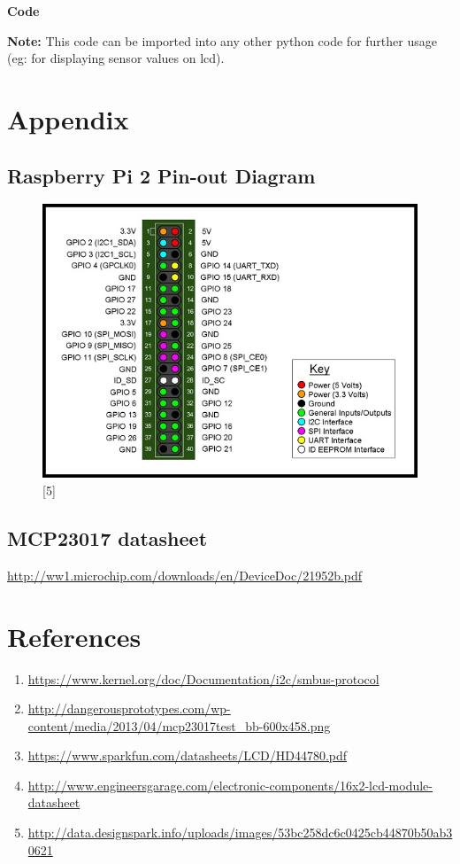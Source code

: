 \documentclass[11pt,a4paper]{article}
\begin{document}
	\newpage 
	\textbf{Code}
	\vspace{0.3cm}
	
	
	
	\vspace{0.3cm}
	\textbf{Note:} This code can be imported into any other python code for further usage (eg: for displaying sensor values on lcd).
	
	\newpage
	\section{Appendix}
	
	\subsection{Raspberry Pi 2 Pin-out Diagram}
	\begin{figure}[h!]
		\includegraphics[scale=0.6]{RaspberryPi2_pinout.jpg}
		\centering
		\caption{[5]}
	\end{figure}
			
	\subsection{MCP23017 datasheet}
			
	\url{http://ww1.microchip.com/downloads/en/DeviceDoc/21952b.pdf}
			
	\newpage
	\section{References}
	\begin{enumerate}
		\item \url{https://www.kernel.org/doc/Documentation/i2c/smbus-protocol}
		\item \url{http://dangerousprototypes.com/wp-content/media/2013/04/mcp23017test_bb-600x458.png}
		\item \url{https://www.sparkfun.com/datasheets/LCD/HD44780.pdf}
		\item \url{http://www.engineersgarage.com/electronic-components/16x2-lcd-module-datasheet}
		\item \url{http://data.designspark.info/uploads/images/53bc258dc6c0425cb44870b50ab30621}
    \end{enumerate}
	
\end{document}
